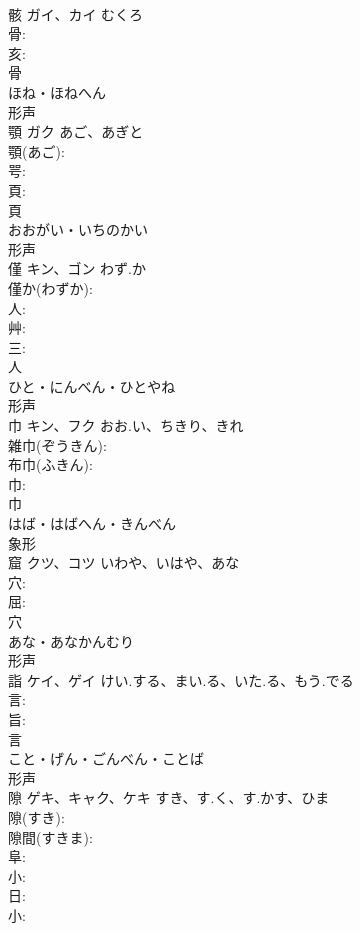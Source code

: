 \documentclass[8pt]{extreport}
\begin{document}
\begin{CJK}{UTF8}{min}
\\	骸	ガイ、カイ	むくろ		
\\	骨: 
\\	亥: 
\\	骨	
\\	ほね・ほねへん	
\\	形声 
\\	顎	ガク	あご、あぎと		
\\	顎(あご): 
\\	咢: 
\\	頁: 
\\	頁	
\\	おおがい・いちのかい	
\\	形声 
\\	僅	キン、ゴン	わず.か		
\\	僅か(わずか): 
\\	人: 
\\	艸: 
\\	三: 
\\	人	
\\	ひと・にんべん・ひとやね	
\\	形声 
\\	巾	キン、フク	おお.い、ちきり、きれ		
\\	雑巾(ぞうきん): 
\\	布巾(ふきん): 
\\	巾: 
\\	巾	
\\	はば・はばへん・きんべん	
\\	象形 
\\	窟	クツ、コツ	いわや、いはや、あな		
\\	穴: 
\\	屈: 
\\	穴	
\\	あな・あなかんむり	
\\	形声 
\\	詣	ケイ、ゲイ	けい.する、まい.る、いた.る、もう.でる		
\\	言: 
\\	旨: 
\\	言	
\\	こと・げん・ごんべん・ことば	
\\	形声 
\\	隙	ゲキ、キャク、ケキ	すき、す.く、す.かす、ひま		
\\	隙(すき): 
\\	隙間(すきま): 
\\	阜: 
\\	小: 
\\	日: 
\\	小: 

\end{CJK}
\end{document}

